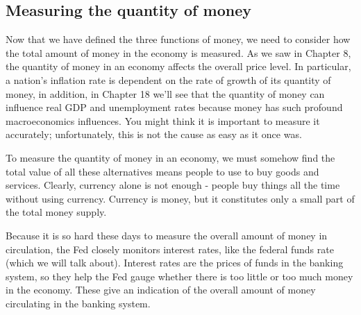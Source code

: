 \documentclass[11pt]{article} %
\begin{document}
\subsection*{Measuring the quantity of money}
Now that we have defined the three functions of money, we need to consider how the total amount of money in the economy is measured. As we saw in Chapter 8, the quantity of money in an economy affects the overall price level. In particular, a nation's inflation rate is dependent on the rate of growth of its quantity of money, in addition, in Chapter 18 we'll see that the quantity of money can influence real GDP and unemployment rates because money has such profound macroeconomics influences. You might think it is important to measure it accurately; unfortunately, this is not the cause as easy as it once was.

To measure the quantity of money in an economy, we must somehow find the total value of all these alternatives means people to use to buy goods and services. Clearly, currency alone is not enough - people buy things all the time without using currency. Currency is money, but it constitutes only a small part of the total money supply.

Because it is so hard these days to measure the overall amount of money in circulation, the Fed closely monitors interest rates, like the federal funds rate (which we will talk about). Interest rates are the prices of funds in the banking system, so they help the Fed gauge whether there is too little or too much money in the economy. These give an indication of the overall amount of money circulating in the banking system.
\end{document}
